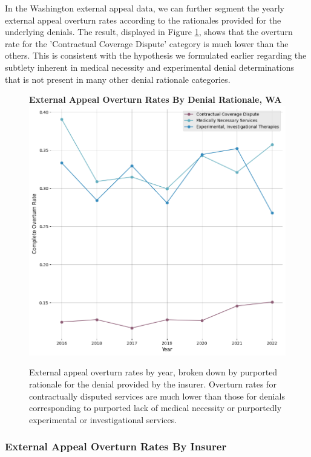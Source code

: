 \documentclass[12pt, a4paper,twoside]{report}
\theoremstyle{plain} %
\theoremstyle{definition} %
\theoremstyle{remark} %
\numberwithin{equation}{chapter}
\begin{document}
		In the Washington external appeal data, we can further segment the yearly external appeal overturn rates according to the rationales provided for the underlying denials. The result, displayed in Figure \ref{waexternalappealsovertimebydenialrationale}, shows that the overturn rate for the 'Contractual Coverage Dispute' category is much lower than the others. This is consistent with the hypothesis we formulated earlier regarding the subtlety inherent in medical necessity and experimental denial determinations that is not present in many other denial rationale categories.
		
		\begin{figure}[h!]
			\centering
			\textbf{External Appeal Overturn Rates By Denial Rationale, WA}
			\includegraphics[width=.8\textwidth]{images/wa_external_appeals/external_appeal_overturn_rates_by_denial_rationale_by_year.png}
			\caption{External appeal overturn rates by year, broken down by purported rationale for the denial provided by the insurer. Overturn rates for contractually disputed services are much lower than those for denials corresponding to purported lack of medical necessity or purportedly experimental or investigational services.}
			\label{waexternalappealsovertimebydenialrationale}
		\end{figure}
		
				
		
		\subsubsection{External Appeal Overturn Rates By Insurer}
		
\end{document}
